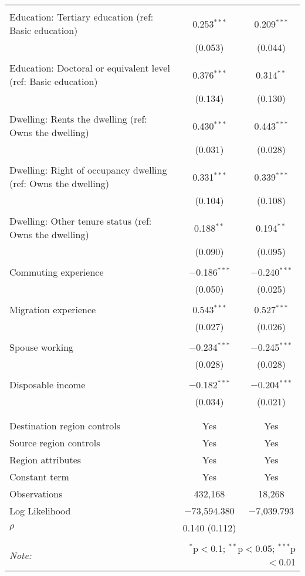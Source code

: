 \begin{table}[!htbp]
\begin{tabular}{@{\extracolsep{5pt}}lcc}
  & & \\ 
 Education: Tertiary education (ref: Basic education) & 0.253$^{***}$ & 0.209$^{***}$ \\ 
  & (0.053) & (0.044) \\ 
  & & \\ 
 Education: Doctoral or equivalent level (ref: Basic education) & 0.376$^{***}$ & 0.314$^{**}$ \\ 
  & (0.134) & (0.130) \\ 
  & & \\ 
 Dwelling: Rents the dwelling (ref: Owns the dwelling) & 0.430$^{***}$ & 0.443$^{***}$ \\ 
  & (0.031) & (0.028) \\ 
  & & \\ 
 Dwelling: Right of occupancy dwelling (ref: Owns the dwelling) & 0.331$^{***}$ & 0.339$^{***}$ \\ 
  & (0.104) & (0.108) \\ 
  & & \\ 
 Dwelling: Other tenure status (ref: Owns the dwelling) & 0.188$^{**}$ & 0.194$^{**}$ \\ 
  & (0.090) & (0.095) \\ 
  & & \\ 
 Commuting experience & $-$0.186$^{***}$ & $-$0.240$^{***}$ \\ 
  & (0.050) & (0.025) \\ 
  & & \\ 
 Migration experience & 0.543$^{***}$ & 0.527$^{***}$ \\ 
  & (0.027) & (0.026) \\ 
  & & \\ 
 Spouse working & $-$0.234$^{***}$ & $-$0.245$^{***}$ \\ 
  & (0.028) & (0.028) \\ 
  & & \\ 
 Disposable income & $-$0.182$^{***}$ & $-$0.204$^{***}$ \\ 
  & (0.034) & (0.021) \\ 
  & & \\ 
\hline \\[-1.8ex] 
Destination region controls & Yes & Yes \\ 
Source region controls & Yes & Yes \\ 
Region attributes & Yes & Yes \\ 
Constant term & Yes & Yes \\ 
Observations & 432,168 & 18,268 \\ 
Log Likelihood & $-$73,594.380 & $-$7,039.793 \\ 
$\rho$ & 0.140  (0.112) &  \\ 
\hline 
\hline \\[-1.8ex] 
\textit{Note:}  & \multicolumn{2}{r}{$^{*}$p$<$0.1; $^{**}$p$<$0.05; $^{***}$p$<$0.01} \\ 
\end{tabular} 
\end{table} 
